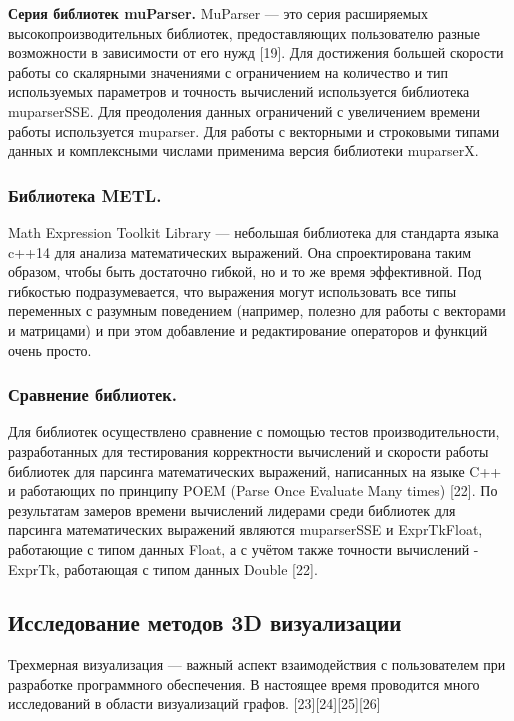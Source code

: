 \textbf{Серия библиотек muParser.} MuParser — это серия расширяемых высокопроизводительных библиотек, предоставляющих пользователю разные возможности в зависимости от его нужд [19]. Для достижения большей скорости работы со скалярными значениями с ограничением на количество и тип используемых параметров и точность вычислений используется библиотека muparserSSE. Для преодоления данных ограничений с увеличением времени работы используется muparser. Для работы с векторными и строковыми типами данных и комплексными числами применима версия библиотеки muparserX.

\subsubsection {Библиотека METL.}

Math Expression Toolkit Library — небольшая библиотека для стандарта языка c++14 для анализа математических выражений. Она спроектирована таким образом, чтобы быть достаточно гибкой, но и то же время эффективной. Под гибкостью подразумевается, что выражения могут использовать все типы переменных с разумным поведением (например, полезно для работы с векторами и матрицами) и при этом добавление и редактирование операторов и функций очень просто.

\subsubsection{Сравнение библиотек.}

Для библиотек осуществлено сравнение с помощью тестов производительности, разработанных для тестирования корректности вычислений и скорости работы библиотек для парсинга математических выражений, написанных на языке C++ и работающих по принципу POEM (Parse Once Evaluate Many times) [22]. По результатам замеров времени вычислений лидерами среди библиотек для парсинга математических выражений являются muparserSSE и ExprTkFloat, работающие с типом данных Float, а с учётом также точности вычислений - ExprTk, работающая с типом данных  Double [22].

\subsection{Исследование методов 3D визуализации}

Трехмерная визуализация — важный аспект взаимодействия с пользователем при разработке программного обеспечения. В настоящее время проводится много исследований в области визуализаций графов. [23][24][25][26]

